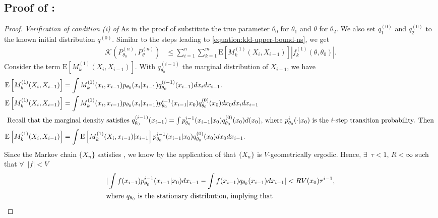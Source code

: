 \documentclass[11pt]{amsart}
\newcommand{\E}{\mathrm{E}}
\newcommand{\kld}{ \mathcal{K}(P^{(n)}_{\theta_0},P^{(n)}_{\theta})}
\begin{document}
\subsection{Proof of  : }
\begin{proof}
\textit{Verification of condition (i) of }
As in the proof of  substitute the true parameter $\theta_0$  for $\theta_1$ and $\theta$ for $\theta_2$. 
We also set $q_{1}^{(0)}$ and $q_{2}^{(0)}$ to the known initial distribution $q^{(0)}$. 
Similar to the steps leading to \cref{equation:kld-upper-bound-ns}, we get
\begin{align*}
    \kld & \leq \sum_{i=1}^n  \sum_{k=1}^{m} \E \left[ M^{(1)}_k(X_i,X_{i-1}) \right]|f^{(1)}_k(\theta,\theta_0)|.
\end{align*}
Consider the term $\E\left[{ M^{(1)}_k(X_i,X_{i-1})} \right]$. 
With $q^{(i-1)}_{\theta_0}$ the marginal distribution of $X_{i-1}$, we have
\begin{align*}
    \E\left[ M^{(1)}_k(X_i,X_{i-1}) \right] & = \int M^{(1)}_k(x_i,x_{i-1}) p_{\theta_0}(x_{i}|x_{i-1}) q^{(i-1)}_{\theta_0}(x_{i-1}) dx_{i}dx_{i-1}.\\
\E\left[ M^{(1)}_k(X_i,X_{i-1}) \right]  & =  \int M^{(1)}_k(x_i,x_{i-1}) p_{\theta_0}(x_{i}|x_{i-1}) p_{\theta_0}^{i-1}(x_{i-1}|x_{0}) q^{(0)}_{\theta_0}(x_0)dx_{0} dx_{i}dx_{i-1}\\
\intertext{ Recall that the marginal density satisfies $q^{(i-1)}_{\theta_0}(x_{i-1})=\int  p_{\theta_0}^{i-1}(x_{i-1}|x_{0}) q^{(0)}_{\theta_0}(x_0)d(x_{0})$, where $ p_{\theta_0}^{i}(\cdot|x_{0})$ is the $i$-step transition probability. Then }
  \E\left[ M^{(1)}_k(X_i,X_{i-1}) \right]  & =  \int \E \left[M^{(1)}_k(X_i,x_{i-1})|x_{i-1}\right] p_{\theta_0}^{i-1}(x_{i-1}|x_{0}) q^{(0)}_{\theta_0}(x_0)dx_{0} dx_{i-1}.
\end{align*}
 Since the Markov chain $\{X_n\}$ satisfies , we know by the application of  that $\{X_n\}$ is $V$-geometrically ergodic. Hence, $\exists \enspace \tau<1$, $R<\infty$  such that $\forall \enspace |f|<V$
%
\begin{align*}
    |\int f(x_{i-1}) p_{\theta_0}^{i-1}(x_{i-1}|x_{0})  dx_{i-1} & -\int f(x_{i-1}) q_{\theta_0}(x_{i-1})dx_{i-1}|  < RV(x_0)\tau^{i-1},\\
\intertext{where $q_{\theta_0}$ is the stationary distribution, implying that}

\end{align*}
\end{proof}
\end{document}
